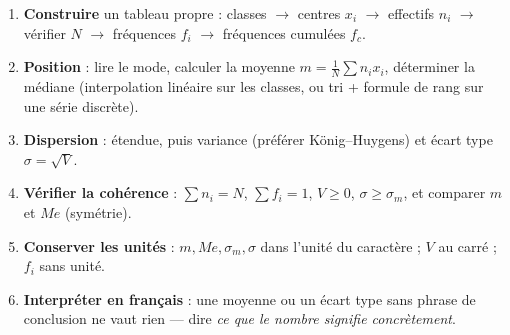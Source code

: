 \documentclass[11pt,a4paper]{article}
\newcommand{\ecm}{\sigma_m}              %
\newcommand{\ect}{\sigma}                %
\newcommand{\med}{M\!e}                  %
\begin{document}
\begin{methode}
\begin{enumerate}[leftmargin=1.8em,topsep=2pt,itemsep=1pt]
  \item \textbf{Construire} un tableau propre : classes $\rightarrow$ centres $x_i$ $\rightarrow$
        effectifs $n_i$ $\rightarrow$ vérifier $N$ $\rightarrow$ fréquences $f_i$ $\rightarrow$
        fréquences cumulées $f_c$.
  \item \textbf{Position} : lire le mode, calculer la moyenne $m=\tfrac{1}{N}\sum n_i x_i$,
        déterminer la médiane (interpolation linéaire sur les classes, ou tri + formule de rang
        sur une série discrète).
  \item \textbf{Dispersion} : étendue, puis variance (préférer König--Huygens) et écart type
        $\ect=\sqrt{V}$.
  \item \textbf{Vérifier la cohérence} : $\sum n_i=N$, $\sum f_i=1$, $V\geqslant 0$,
        $\ect\geqslant\ecm$, et comparer $m$ et $\med$ (symétrie).
  \item \textbf{Conserver les unités} : $m,\med,\ecm,\ect$ dans l'unité du caractère ; $V$ au
        carré ; $f_i$ sans unité.
  \item \textbf{Interpréter en français} : une moyenne ou un écart type sans phrase de conclusion
        ne vaut rien --- dire \emph{ce que le nombre signifie concrètement}.
\end{enumerate}
\end{methode}
\end{document}
